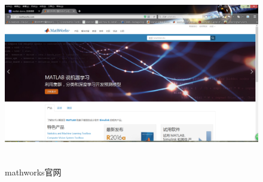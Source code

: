         \begin{figure}[H]
        \centering
        \includegraphics[height=8cm]{images/36.jpg}
        \caption{mathworks官网}
        \label{mathworks官网}
        \end{figure}
